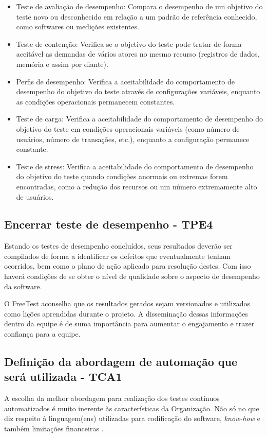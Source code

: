 \begin{itemize}
	\item Teste de avaliação de desempenho: Compara o desempenho de um objetivo do teste novo ou desconhecido em relação a um padrão de referência conhecido, como softwares ou medições existentes.
    \item Teste de contenção: Verifica se o objetivo do teste pode tratar de forma aceitável as demandas de vários atores no mesmo recurso (registros de dados, memória e assim por diante).
    \item Perfis de desempenho: Verifica a aceitabilidade do comportamento de desempenho do objetivo do teste através de configurações variáveis, enquanto as condições operacionais permanecem constantes.
    \item Teste de carga: Verifica a aceitabilidade do comportamento de desempenho do objetivo do teste em condições operacionais variáveis (como número de usuários, número de transações, etc.), enquanto a configuração permanece constante.
    \item Teste de stress: Verifica a aceitabilidade do comportamento de desempenho do objetivo do teste quando condições anormais ou extremas forem encontradas, como a redução dos recursos ou um número extremamente alto de usuários.
\end{itemize}

\subsection{Encerrar teste de desempenho - TPE4}


Estando os testes de desempenho concluídos, seus resultados deverão ser compilados de forma a identificar os defeitos que eventualmente tenham ocorridos, bem como o plano de ação aplicado para resolução destes. Com isso haverá condições de se obter o nível de qualidade sobre o aspecto de desempenho da software.

O FreeTest aconselha que os resultados gerados sejam versionados e utilizados como lições aprendidas durante o projeto. A disseminação dessas informações dentro da equipe é de suma importância para aumentar o engajamento e trazer confiança para a equipe.


\subsection{Definição da abordagem de automação que será utilizada - TCA1}

A escolha da melhor abordagem para realização dos testes contínuos automatizados é muito inerente às características da Organização. Não só no que diz respeito à linguagem(ens) utilizadas para codificação do software, \textit{know-how} e também limitações financeiras \cite{Castelo2015}.

